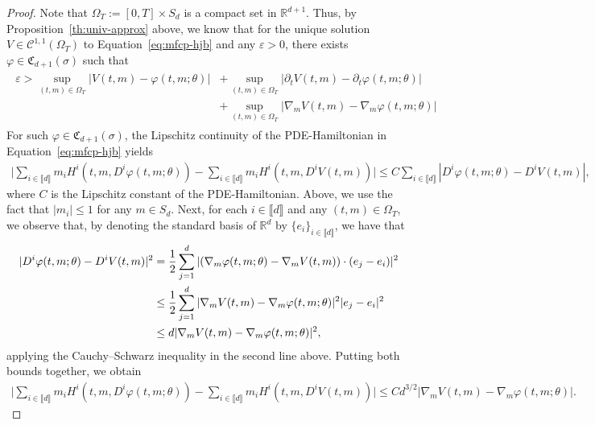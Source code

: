 \documentclass[11pt,reqno]{amsart}
\numberwithin{equation}{section}
\theoremstyle{plain}
\newcommand{\R}{\mathbb{R}}
\newcommand{\sC}{\mathcal{C}}
\newcommand{\lbrs}[1]{\llbracket #1 \rrbracket}
\begin{document}
\begin{proof}
Note that $\Omega_T := [0, T] \times S_d$ is a compact set in $\R^{d+1}$. Thus, by Proposition~\ref{th:univ-approx} above, we know that for the unique solution $V \in \sC^{1,1}(\Omega_T)$ to Equation~\eqref{eq:mfcp-hjb} and any $\varepsilon > 0$, there exists $\varphi \in \mathfrak{C}_{d+1}(\sigma)$ such that
\begin{align}
    \label{eq:univ-approx-est}
    \begin{split}
    \varepsilon > \sup_{(t,m) \in \Omega_T} |V(t,m) - \varphi(t, m; \theta)| &+ \sup_{(t,m) \in \Omega_T} |\partial_t V(t,m) - \partial_t \varphi(t, m; \theta)| \\
    &+ \sup_{(t, m) \in \Omega_T} |\nabla_m V(t,m) - \nabla_m \varphi(t,m; \theta)|  
    \end{split}
\end{align}
For such $\varphi \in \mathfrak{C}_{d+1}(\sigma)$, the Lipschitz continuity of the PDE-Hamiltonian in Equation~\eqref{eq:mfcp-hjb} yields
\begin{align*}
    \Big|\sum_{i \in \lbrs{d}} m_i H^i(t, m, D^i \varphi(t, m; \theta)) - \sum_{i \in \lbrs{d}} m_i H^i(t, m, D^i V(t, m))\Big| \leq C \sum_{i \in \lbrs{d}}|D^i \varphi(t, m; \theta) - D^iV(t,m)|,
\end{align*}
where $C$ is the Lipschitz constant of the PDE-Hamiltonian. Above, we use the fact that $|m_i| \leq 1$ for any $m \in S_d$. Next, for each $i \in \lbrs{d}$ and any $(t, m) \in \Omega_T$, we observe that, by denoting the standard basis of $\R^d$ by $\{e_i\}_{i \in \lbrs{d}}$, we have that
\begin{align}
\label{eq:gradient-error-estimate}
    |D^i \varphi(t, m; \theta) - D^iV(t,m)|^2 &= \frac{1}{2}\sum_{j=1}^d |(\nabla_m \varphi(t,m; \theta)- \nabla_m V(t,m)) \cdot (e_j - e_i)|^2 \notag \\
    &\leq \frac{1}{2}\sum_{j=1}^d |\nabla_m V(t,m) - \nabla _m\varphi(t,m; \theta)|^2 |e_j - e_i|^2 \notag \\
    &\leq d |\nabla_m V(t,m) - \nabla_m \varphi(t,m; \theta)|^2,
\end{align}
applying the Cauchy--Schwarz inequality in the second line above. Putting both bounds together, we obtain
\begin{align}
\label{eq:unif-error-estimate}
    \Big|\sum_{i \in \lbrs{d}} m_i H^i(t, m, D^i \varphi(t, m; \theta)) - \sum_{i \in \lbrs{d}} m_i H^i(t, m, D^i V(t, m))\Big| \leq C d^{3/2} |\nabla_m V(t,m) - \nabla_m \varphi(t,m; \theta)|.
\end{align}

\end{proof}
\end{document}
